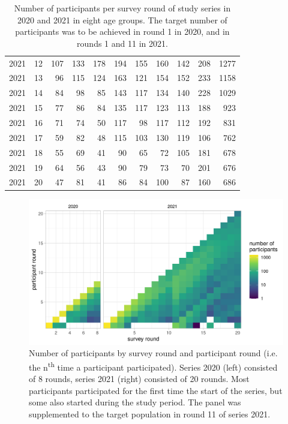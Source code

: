\documentclass[fleqn,10pt]{wlscirep}
\begin{document}
\begin{table}[ht]
\begin{tabular}{rrrrrrrrrrr}
  2021 &  12 & 107 & 133 & 178 & 194 & 155 & 160 & 142 & 208 & 1277 \\ 
  2021 &  13 &  96 & 115 & 124 & 163 & 121 & 154 & 152 & 233 & 1158 \\ 
  2021 &  14 &  84 &  98 &  85 & 143 & 117 & 134 & 140 & 228 & 1029 \\ 
  2021 &  15 &  77 &  86 &  84 & 135 & 117 & 123 & 113 & 188 & 923 \\ 
  2021 &  16 &  71 &  74 &  50 & 117 &  98 & 117 & 112 & 192 & 831 \\ 
  2021 &  17 &  59 &  82 &  48 & 115 & 103 & 130 & 119 & 106 & 762 \\ 
  2021 &  18 &  55 &  69 &  41 &  90 &  65 &  72 & 105 & 181 & 678 \\ 
  2021 &  19 &  64 &  56 &  43 &  90 &  79 &  73 &  70 & 201 & 676 \\ 
  2021 &  20 &  47 &  81 &  41 &  86 &  84 & 100 &  87 & 160 & 686 \\ 
   \hline
\end{tabular}
\caption{\label{tab:part_round}Number of participants per survey round of study series in 2020 and 2021 in eight age groups. The target number of participants was to be achieved in round 1 in 2020, and in rounds 1 and 11 in 2021.} 
\end{table}

\begin{figure}[ht]
\centering
\includegraphics[width=\linewidth]{../figures/participant_rounds.png}
\caption{Number of participants by survey round and participant round (i.e. the n\textsuperscript{th} time a participant participated). Series 2020 (left) consisted of 8 rounds, series 2021 (right) consisted of 20 rounds. Most participants participated for the first time the start of the series, but some also started during the study period. The panel was supplemented to the target population in round 11 of series 2021.}
\label{fig:part_round}
\end{figure}
\end{document}
